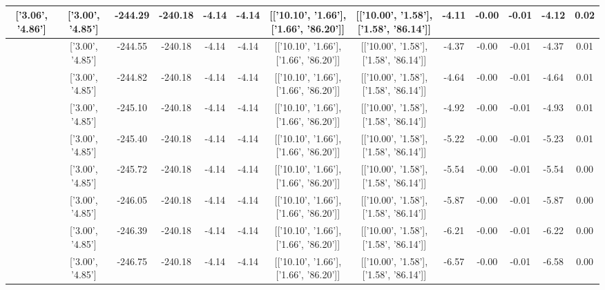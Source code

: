 \begin{table}[htbp]
\begin{adjustbox}{angle=90}
\begin{tabular}{|c|c|c|c|c|c|c|c|c|c|c|c|c|}
 ['3.06', '4.86'] & ['3.00', '4.85'] & -244.29 & -240.18 & -4.14 & -4.14 & [['10.10', '1.66'], ['1.66', '86.20']] & [['10.00', '1.58'], ['1.58', '86.14']] & -4.11 & -0.00 & -0.01 & -4.12 & 0.02\\ \hline
 ['3.07', '4.86'] & ['3.00', '4.85'] & -244.55 & -240.18 & -4.14 & -4.14 & [['10.10', '1.66'], ['1.66', '86.20']] & [['10.00', '1.58'], ['1.58', '86.14']] & -4.37 & -0.00 & -0.01 & -4.37 & 0.01\\ \hline
 ['3.07', '4.86'] & ['3.00', '4.85'] & -244.82 & -240.18 & -4.14 & -4.14 & [['10.10', '1.66'], ['1.66', '86.20']] & [['10.00', '1.58'], ['1.58', '86.14']] & -4.64 & -0.00 & -0.01 & -4.64 & 0.01\\ \hline
 ['3.07', '4.86'] & ['3.00', '4.85'] & -245.10 & -240.18 & -4.14 & -4.14 & [['10.10', '1.66'], ['1.66', '86.20']] & [['10.00', '1.58'], ['1.58', '86.14']] & -4.92 & -0.00 & -0.01 & -4.93 & 0.01\\ \hline
 ['3.08', '4.86'] & ['3.00', '4.85'] & -245.40 & -240.18 & -4.14 & -4.14 & [['10.10', '1.66'], ['1.66', '86.20']] & [['10.00', '1.58'], ['1.58', '86.14']] & -5.22 & -0.00 & -0.01 & -5.23 & 0.01\\ \hline
 ['3.08', '4.86'] & ['3.00', '4.85'] & -245.72 & -240.18 & -4.14 & -4.14 & [['10.10', '1.66'], ['1.66', '86.20']] & [['10.00', '1.58'], ['1.58', '86.14']] & -5.54 & -0.00 & -0.01 & -5.54 & 0.00\\ \hline
 ['3.09', '4.86'] & ['3.00', '4.85'] & -246.05 & -240.18 & -4.14 & -4.14 & [['10.10', '1.66'], ['1.66', '86.20']] & [['10.00', '1.58'], ['1.58', '86.14']] & -5.87 & -0.00 & -0.01 & -5.87 & 0.00\\ \hline
 ['3.09', '4.86'] & ['3.00', '4.85'] & -246.39 & -240.18 & -4.14 & -4.14 & [['10.10', '1.66'], ['1.66', '86.20']] & [['10.00', '1.58'], ['1.58', '86.14']] & -6.21 & -0.00 & -0.01 & -6.22 & 0.00\\ \hline
 ['3.09', '4.86'] & ['3.00', '4.85'] & -246.75 & -240.18 & -4.14 & -4.14 & [['10.10', '1.66'], ['1.66', '86.20']] & [['10.00', '1.58'], ['1.58', '86.14']] & -6.57 & -0.00 & -0.01 & -6.58 & 0.00\\ \hline
            \end{tabular}
        \end{adjustbox}
        \caption{}
        \label{}
    \end{table}
    